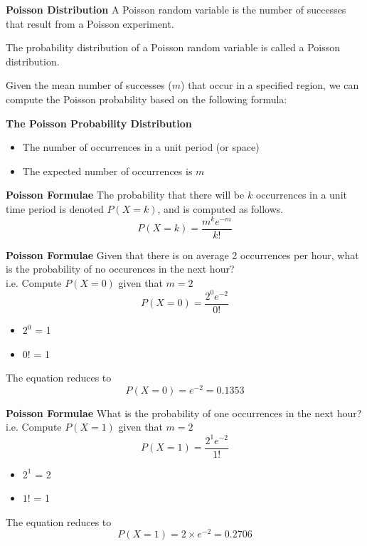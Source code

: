 \documentclass[12pt, a4paper]{report}
\author{ } \date{ }
\theoremstyle{definition}
\theoremstyle{remark}
\begin{document}
	
	{
		\textbf{Poisson Distribution}
		A Poisson random variable is the number of successes that result from a Poisson experiment.
		
		The probability distribution of a Poisson random variable is called a Poisson distribution.
		
		Given the mean number of successes ($m$) that occur in a specified region, we can compute the Poisson probability based on the following formula:
	}
	
	{
		\textbf{The Poisson Probability Distribution}
		\begin{itemize}
			\item The number of occurrences in a unit period (or space)
			\item The expected number of occurrences is $m$
		\end{itemize}
	}
	
	{
		\textbf{Poisson Formulae}
		The probability that there will be $k$ occurrences in a unit time period is denoted $P(X=k)$, and is computed as follows.
		\Large
		\[ P(X = k)=\frac{m^k e^{-m}}{k!} \]
		
	}
	{
		\textbf{Poisson Formulae}
		Given that there is on average 2 occurrences per hour, what is the probability of no occurences in the next hour? \\ i.e. Compute $P(X=0)$ given that $m=2$
		\Large
		\[ P(X = 0)=\frac{2^0 e^{-2}}{0!} \]
		\normalsize
		\begin{itemize}
			\item $2^0$ = 1
			\item $0!$ = 1
		\end{itemize}
		The equation reduces to
		\[ P(X = 0)=e^{-2} = 0.1353\]
	}
	{
		\textbf{Poisson Formulae}
		What is the probability of one occurrences in the next hour? \\ i.e. Compute $P(X=1)$ given that $m=2$
		\Large
		\[ P(X = 1)=\frac{2^1 e^{-2}}{1!} \]
		\normalsize
		\begin{itemize}
			\item $2^1$ = 2
			\item $1!$ = 1
		\end{itemize}
		The equation reduces to
		\[ P(X = 1) = 2 \times e^{-2} = 0.2706\]
	}
\end{document}

